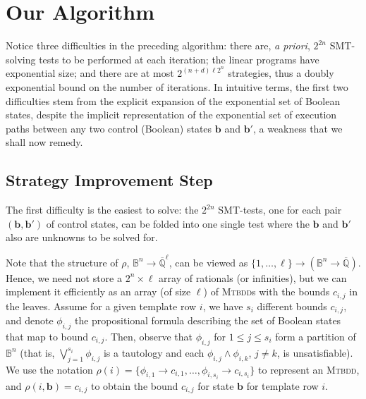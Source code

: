 \documentclass{llncs}
\newcommand{\pponly}[1]{}
\newcommand{\rronly}[1]{#1}
\newcommand{\BB}{\mathbb{B}}
\newcommand{\QQ}{\mathbb{Q}}
\newcommand{\sleq}{\!\leq\!}
\renewcommand{\vec}[1]{{\boldsymbol #1}}
\begin{document}
\section{Our Algorithm}
\label{sec:our_algorithm}
Notice three difficulties in the preceding algorithm: there are,
\emph{a priori}, $2^{2n}$ SMT-solving tests to be performed at each
iteration; the linear programs have exponential size; and there are at
most $2^{(n+d)\ell 2^n}$ strategies, thus a doubly exponential bound on the
number of iterations.
In intuitive terms, the first two difficulties stem from the explicit
expansion of the exponential set of Boolean states, despite the
implicit representation of the exponential set of execution paths
between any two control (Boolean) states $\vec{b}$ and $\vec{b}'$, a
weakness that we shall now remedy.

\subsection{Strategy Improvement Step}
\label{sec:new_strategy_improvement}

The first difficulty is the easiest to solve: the $2^{2n}$ SMT-tests,
one for each pair $(\vec{b},\vec{b} ')$ of control states, can be
folded into one single test where the $\vec{b}$ and $\vec{b}'$ also
are unknowns to be solved for.

Note that the structure of 
$\rho$, $\BB^n \rightarrow \overline{\QQ}^\ell$,
can be viewed as 
$\{1,\ldots,\ell\}\rightarrow (\BB^n \rightarrow \overline{\QQ})$.
Hence, we need not store a $2^n \times \ell$ array of rationals (or
infinities), but we can implement it efficiently as an array (of size
$\ell$) of \textsc{Mtbdd}s \cite{DBLP:journals/tc/Bryant86} with the bounds $c_{i,j}$ in the leaves.
Assume for a given template row $i$, we have $s_i$ different bounds
$c_{i,j}$, and denote $\phi_{i,j}$ the propositional formula
describing the set of Boolean states that map to bound $c_{i,j}$.
Then, observe that $\phi_{i,j}$ for $1\sleq j\sleq s_i$ form a
partition of $\BB^n$\rronly{ (that is, $\bigvee_{j=1}^{s_i} \phi_{i,j}$ is a tautology and each $\phi_{i,j} \land \phi_{i,k}$, $j \neq k$, is unsatisfiable)}.
We use the notation $\rho(i) = \{\phi_{i,1} \rightarrow
c_{i,1},\ldots,\phi_{i,s_i} \rightarrow c_{i,s_i}\}$ to represent an
\textsc{Mtbdd}, and $\rho(i,\vec{b}) = c_{i,j}$ to obtain the bound
$c_{i,j}$ for state $\vec{b}$ for template row $i$.\pponly{\\[-4ex]}
\end{document}
